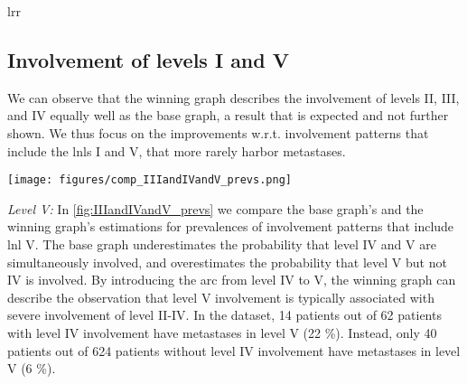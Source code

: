 \documentclass[twocolumn]{aastex631}
\begin{document}
\begin{deluxetable}{lrr}
    \startdata
    \enddata
\end{deluxetable}

\subsection{Involvement of levels I and V}

We can observe that the winning graph describes the involvement of levels II, III, and IV equally well as the base graph, a result that is expected and not further shown. We thus focus on the improvements w.r.t. involvement patterns that include the \glspl{lnl} I and V, that more rarely harbor metastases.

\begin{figure*}
    \begin{centering}
        \texttt{[image: figures/comp\_IIIandIVandV\_prevs.png]}
        \caption{Observed (Beta posteriors as lines) vs. predicted (histograms) prevalences of involvement combinations that include \gls{lnl} V. We have plotted the predictions from the winning graph (colored histograms) and those of the base graph (gray, hatched histograms). The top two panels show scenarios for early T-category patients, the bottom two panels for advanced T-category. The left two panels consider combinations of \gls{lnl} III and V involvement, while the right two panels consider combinations of \gls{lnl} IV and V. The colored lines show the Beta posterior over the prevalence of the respective involvement pattern, given the data. \label{fig:IIIandIVandV_prevs}}
    \end{centering}
\end{figure*}

{\it Level V:} In \autoref{fig:IIIandIVandV_prevs} we compare the base graph's and the winning graph's estimations for prevalences of involvement patterns that include \gls{lnl} V. The base graph underestimates the probability that level IV and V are simultaneously involved, and overestimates the probability that level V but not IV is involved. By introducing the arc from level IV to V, the winning graph can describe the observation that level V involvement is typically associated with severe involvement of level II-IV. In the dataset, 14 patients out of 62 patients with level IV involvement have metastases in level V (22 \%). Instead, only 40 patients out of 624 patients without level IV involvement have metastases in level V (6 \%).
\end{document}
